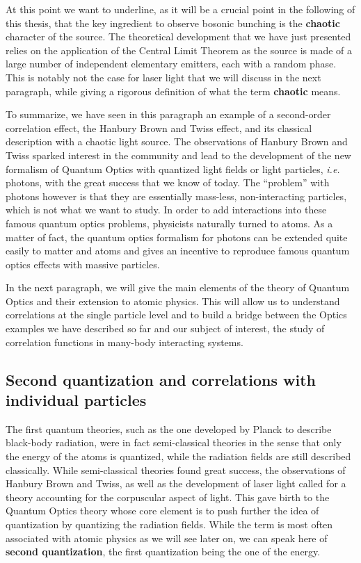 At this point we want to underline, as it will be a crucial point in the following of this thesis, that the key ingredient to observe bosonic bunching is the \textbf{chaotic} character of the source. The theoretical development that we have just presented relies on the application of the Central Limit Theorem as the source is made of a large number of independent elementary emitters, each with a random phase. This is notably not the case for laser light that we will discuss in the next paragraph, while giving a rigorous definition of what the term \textbf{chaotic} means.


To summarize, we have seen in this paragraph an example of a second-order correlation effect, the Hanbury Brown and Twiss effect, and its classical description with a chaotic light source. The observations of Hanbury Brown and Twiss sparked interest in the community and lead to the development of the new formalism of Quantum Optics \cite{glauber1963quantum} with quantized light fields or light particles, {\it i.e.} photons, with the great success that we know of today. The ``problem'' with photons however is that they are essentially mass-less, non-interacting particles, which is not what we want to study. In order to add interactions into these famous quantum optics problems, physicists naturally turned to atoms. As a matter of fact, the quantum optics formalism for photons can be extended quite easily to matter and atoms and gives an incentive to reproduce famous quantum optics effects with massive particles.

In the next paragraph, we will give the main elements of the theory of Quantum Optics and their extension to atomic physics. This will allow us to understand correlations at the single particle level and to build a bridge between the Optics examples we have described so far and our subject of interest, the study of correlation functions in many-body interacting systems.


\subsection{Second quantization and correlations with individual particles}

The first quantum theories, such as the one developed by Planck to describe black-body radiation, were in fact semi-classical theories in the sense that only the energy of the atoms is quantized, while the radiation fields are still described classically. While semi-classical theories found great success, the observations of Hanbury Brown and Twiss, as well as the development of laser light called for a theory accounting for the corpuscular aspect of light. This gave birth to the Quantum Optics theory whose core element is to push further the idea of quantization by quantizing the radiation fields. While the term is most often associated with atomic physics as we will see later on, we can speak here of \textbf{second quantization}, the first quantization being the one of the energy.

